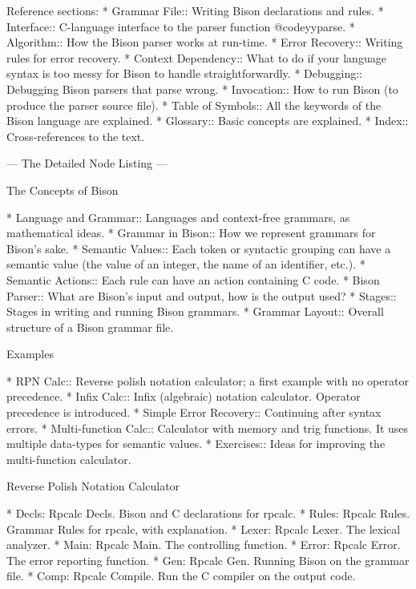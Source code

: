 Reference sections:
* Grammar File::      Writing Bison declarations and rules.
* Interface::         C-language interface to the parser function @code{yyparse}.
* Algorithm::         How the Bison parser works at run-time.
* Error Recovery::    Writing rules for error recovery.
* Context Dependency::  What to do if your language syntax is too
                        messy for Bison to handle straightforwardly.
* Debugging::         Debugging Bison parsers that parse wrong.
* Invocation::        How to run Bison (to produce the parser source file).
* Table of Symbols::  All the keywords of the Bison language are explained.
* Glossary::          Basic concepts are explained.
* Index::             Cross-references to the text.

 --- The Detailed Node Listing ---

The Concepts of Bison

* Language and Grammar::  Languages and context-free grammars,
                            as mathematical ideas.
* Grammar in Bison::  How we represent grammars for Bison's sake.
* Semantic Values::   Each token or syntactic grouping can have
                        a semantic value (the value of an integer,
                        the name of an identifier, etc.).
* Semantic Actions::  Each rule can have an action containing C code.
* Bison Parser::      What are Bison's input and output,
                        how is the output used?
* Stages::            Stages in writing and running Bison grammars.
* Grammar Layout::    Overall structure of a Bison grammar file.

Examples

* RPN Calc::          Reverse polish notation calculator;
                        a first example with no operator precedence.
* Infix Calc::        Infix (algebraic) notation calculator.
                        Operator precedence is introduced.
* Simple Error Recovery::  Continuing after syntax errors.
* Multi-function Calc::    Calculator with memory and trig functions.
                        It uses multiple data-types for semantic values.
* Exercises::         Ideas for improving the multi-function calculator.

Reverse Polish Notation Calculator

* Decls: Rpcalc Decls.  Bison and C declarations for rpcalc.
* Rules: Rpcalc Rules.  Grammar Rules for rpcalc, with explanation.
* Lexer: Rpcalc Lexer.  The lexical analyzer.
* Main: Rpcalc Main.    The controlling function.
* Error: Rpcalc Error.  The error reporting function.
* Gen: Rpcalc Gen.      Running Bison on the grammar file.
* Comp: Rpcalc Compile. Run the C compiler on the output code.

